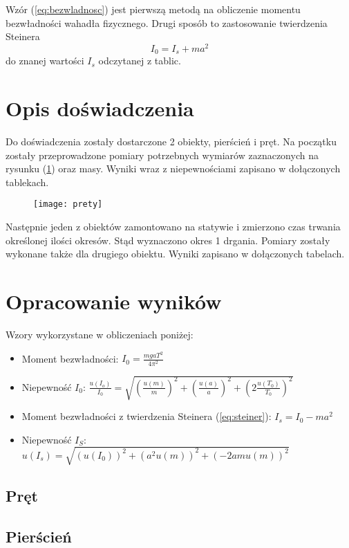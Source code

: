 \documentclass[a4paper,10pt,twoside]{article}
\begin{document}
Wzór (\ref{eq:bezwladnosc}) jest pierwszą metodą na obliczenie momentu bezwładności wahadła fizycznego. Drugi sposób to zastosowanie
twierdzenia Steinera
\begin{equation}
\label{eq:steiner}
I_0 = I_s + ma^2
\end{equation}
do znanej wartości $I_s$ odczytanej z tablic.

\section{Opis doświadczenia}
Do doświadczenia zostały dostarczone 2 obiekty, pierścień i pręt. Na początku zostały przeprowadzone pomiary potrzebnych wymiarów
zaznaczonych na rysunku (\ref{fig:prety}) oraz masy. Wyniki wraz z niepewnościami zapisano w dołączonych tablekach. 
\begin{figure}[H]
\centerline{\texttt{[image: prety]}}
\label{fig:prety}
\end{figure}

Następnie jeden z obiektów zamontowano na statywie i zmierzono czas trwania określonej ilości okresów. Stąd wyznaczono okres 1 drgania.
Pomiary zostały wykonane także dla drugiego obiektu. Wyniki zapisano w dołączonych tabelach.

\newpage
\section{Opracowanie wyników}
\noindent
Wzory wykorzystane w obliczeniach poniżej:
\begin{itemize}
\item Moment bezwładności: $I_0=\frac{mgaT^2}{4\pi ^2}$
\item Niepewność $I_0$: $\frac{u(I_o)}{I_0}=\sqrt{\left (\frac{u(m)}{m}\right ) ^2+\left ( \frac{u(a)}{a}\right )^2+\left (2 \frac{u(T_0)}{T_0}\right )^2}$
\item Moment bezwładności z twierdzenia Steinera (\ref{eq:steiner}): $I_s=I_0-ma^2$
\item Niepewność $I_S$: $u(I_s)=\sqrt{\left( u(I_0)\right)^2+\left(a^2u(m) \right)^2+\left( -2amu(m)\right)^2}$
\end{itemize}

\subsection{Pręt}


\newpage
\subsection{Pierścień}

\end{document}
